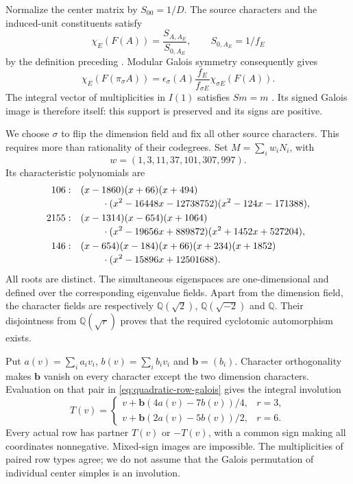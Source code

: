 Normalize the center matrix by $S_{00}=1/D$. The source characters
and the induced-unit constituents satisfy
\[
 \chi_E(F(A))=\frac{S_{A,A_E}}{S_{0,A_E}},\qquad
 S_{0,A_E}=1/f_E
\]
by the definition preceding \cite[Theorem~2.13]{OstrikRank3}.
Modular Galois symmetry consequently gives
\begin{equation}\label{eq:quadratic-row-galois}
 \chi_E(F(\pi_\sigma A))
 =\epsilon_\sigma(A)\frac{f_E}{f_{\sigma E}}
                          \chi_{\sigma E}(F(A)).
\end{equation}
The integral vector of multiplicities in $I(1)$ satisfies $Sm=m$
\cite[Proposition~2.8]{OstrikRank3}. Its signed Galois image is
therefore itself: this support is preserved and its signs are positive.

We choose $\sigma$ to flip the dimension field and fix all other
source characters. This requires more than rationality of their
codegrees. Set $M=\sum_i w_iN_i$, with
\[
                  w=(1,3,11,37,101,307,997).
\]
Its characteristic polynomials are
\begin{align*}
106:\quad &(x-1860)(x+66)(x+494)\\[-2pt]
 &\hspace{8mm}\cdot(x^2-16448x-12738752)(x^2-124x-171388),\\
2155:\quad &(x-1314)(x-654)(x+1064)\\[-2pt]
 &\hspace{8mm}\cdot(x^2-19656x+889872)(x^2+1452x+527204),\\
146:\quad &(x-654)(x-184)(x+66)(x+234)(x+1852)\\[-2pt]
 &\hspace{8mm}\cdot(x^2-15896x+12501688).
\end{align*}
All roots are distinct. The simultaneous eigenspaces are one-dimensional
and defined over the corresponding eigenvalue fields. Apart from the
dimension field, the character fields are respectively
$\mathbb Q(\sqrt2)$, $\mathbb Q(\sqrt{-2})$ and $\mathbb Q$.
Their disjointness from $\mathbb Q(\sqrt r)$ proves that the required
cyclotomic automorphism exists.

Put $a(v)=\sum_i a_iv_i$, $b(v)=\sum_i b_iv_i$ and
$\mathbf b=(b_i)$. Character orthogonality makes $\mathbf b$ vanish
on every character except the two dimension characters. Evaluation
on that pair in \eqref{eq:quadratic-row-galois} gives the integral
involution
\begin{equation}\label{eq:quadratic-row-transport}
 T(v)=\begin{cases}
 v+\mathbf b(4a(v)-7b(v))/4,&r=3,\\
 v+\mathbf b(2a(v)-5b(v))/2,&r=6.
 \end{cases}
\end{equation}
Every actual row has partner $T(v)$ or $-T(v)$, with a common sign
making all coordinates nonnegative. Mixed-sign images are impossible.
The multiplicities of paired row types agree; we do not assume that
the Galois permutation of individual center simples is an involution.

